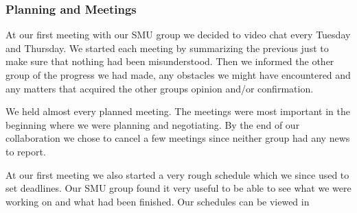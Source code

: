 \subsubsection{Planning and Meetings}
At our first meeting with our SMU group we decided to video chat every Tuesday and Thursday. We started each meeting by summarizing the previous just to make sure that nothing had been misunderstood. Then we informed the other group of the progress we had made, any obstacles we might have encountered and any matters that acquired the other groups opinion and/or confirmation. 

We held almost every planned meeting. The meetings were most important in the beginning where we were planning and negotiating. By the end of our collaboration we chose to cancel a few meetings since neither group had any news to report.

At our first meeting we also started a very rough schedule which we since used to set deadlines. Our SMU group found it very useful to be able to see what we were working on and what had been finished.
Our schedules can be viewed in 
